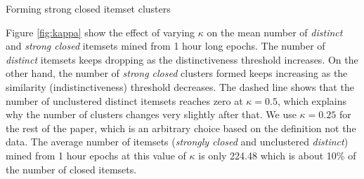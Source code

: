 \documentclass{sig-alternate}
\begin{document}
\begin{algorithm}
\SetAlgoLined
\LinesNumbered
{} %
\;
\caption{Forming strong closed itemset clusters}
\label{algo:alliance}
\end{algorithm}

Figure \ref{fig:kappa} show the effect of varying $\kappa$ on the mean number of \emph{distinct} and \emph{strong closed} itemsets mined from 1 hour long epochs. The number of \emph{distinct} itemsets keeps dropping as the distinctiveness threshold increases. On the other hand, the number of \emph{strong closed} clusters formed keeps increasing as the similarity (indistinctiveness) threshold decreases. The dashed line shows that the number of unclustered distinct itemsets reaches zero at $\kappa=0.5$, which explains why the number of clusters changes very slightly after that. 
We use $\kappa = 0.25$ for the rest of the paper, which is an arbitrary choice based on the definition not the data. The average number of itemsets (\emph{strongly closed} and unclustered \emph{distinct}) mined from 1 hour epochs at this value of $\kappa$ is only 224.48 which is about 10\% of the number of closed itemsets.
\end{document}
